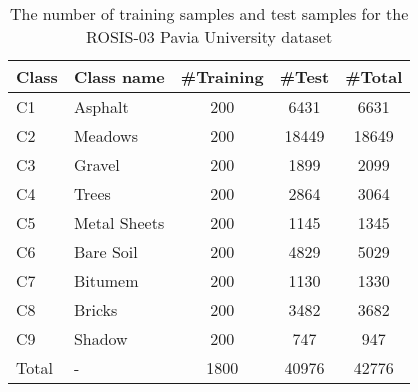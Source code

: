 \documentclass[journal]{IEEEtran}
\begin{document}
\begin{table}[htb]
  \caption{The number of training samples and test samples for the ROSIS-03 Pavia University dataset
    \label{tab:pavia_sample}}
  \centering
  \renewcommand{\arraystretch}{1.5}
  \begin{tabular}{l|l|c|c|c}
    \hline
    Class & Class name   & \#Training & \#Test & \#Total \\
    \hline
    C1    & Asphalt      & 200        & 6431   & 6631    \\
    C2    & Meadows      & 200        & 18449  & 18649   \\
    C3    & Gravel       & 200        & 1899   & 2099    \\
    C4    & Trees        & 200        & 2864   & 3064    \\
    C5    & Metal Sheets & 200        & 1145   & 1345    \\
    C6    & Bare Soil    & 200        & 4829   & 5029    \\
    C7    & Bitumem      & 200        & 1130   & 1330    \\
    C8    & Bricks       & 200        & 3482   & 3682    \\
    C9    & Shadow       & 200        & 747    & 947     \\
    \hline
    Total & -            & 1800       & 40976  & 42776   \\
    \hline
  \end{tabular}
\end{table}
\end{document}
